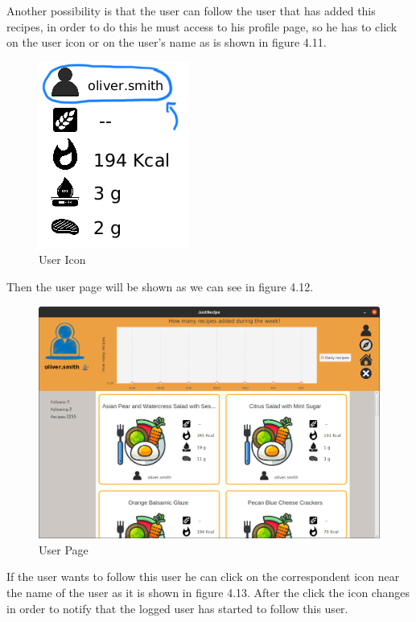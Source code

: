 \documentclass[a4paper]{report}
\begin{document}
\newpage


\noindent Another possibility is that the user can follow the user that has added this recipes, in order to do this he must access to his profile page, so he has to click on the user icon or on the user's name as is shown in figure 4.11.

\begin{figure}[htpb]
	\centering
	\includegraphics[scale=0.38]{img/user_manual/user-icon.png}
	\caption{User Icon}
\end{figure}

\noindent Then the user page will be shown as we can see in figure 4.12.

\begin{figure}[htpb]
	\centering
	\includegraphics[scale=0.38]{img/user_manual/generic-user-page.png}
	\caption{User Page}
\end{figure}

\noindent If the user wants to follow this user he can click on the correspondent icon near the name of the user as it is shown in figure 4.13. After the click the icon changes in order to notify that the logged user has started to follow this user.
\end{document}
